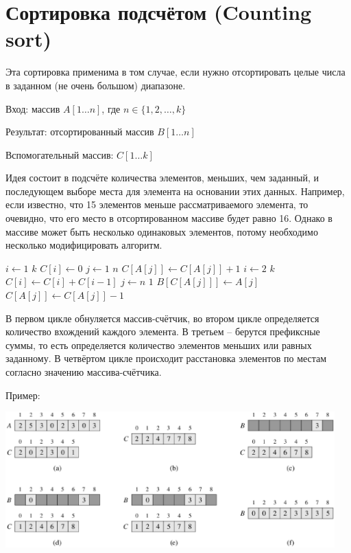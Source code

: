 \documentclass[a4paper,11pt]{article}
\begin{document}
\section{Сортировка подсчётом (Counting sort)}
Эта сортировка применима в том случае, если нужно отсортировать целые числа в
заданном (не очень большом) диапазоне.

Вход: массив $A[1 \ldots n]$, где $n \in \lbrace 1, 2, \ldots, k \rbrace$

Результат: отсортированный массив $B[1 \ldots n]$

Вспомогательный массив: $C[1 \ldots k]$

Идея состоит в подсчёте количества элементов, меньших, чем заданный, и
последующем выборе места для элемента на основании этих данных. Например, если
известно, что 15 элементов меньше рассматриваемого элемента, то очевидно, что
его место в отсортированном массиве будет равно 16. Однако в массиве может быть
несколько одинаковых элементов, потому необходимо несколько модифицировать
алгоритм.

\begin{codebox}
\li \For $i \gets 1 $ \To $k$
\li      \Do $C[i] \gets 0$ \End
\li \For $j \gets 1 $ \To $n$
\li      \Do $C[A[j]] \gets C[A[j]] + 1$ \End
\li \For $i \gets 2 $ \To $k$
\li      \Do $C[i] \gets C[i] + C[i-1]$ \End
\li \For $j \gets n $ \Downto $1$
\li      \Do $B[C[A[j]]] \gets A[j]$
\li          $C[A[j]] \gets C[A[j]] - 1$
         \End
\end{codebox}

В первом цикле обнуляется массив-счётчик, во втором цикле определяется
количество вхождений каждого элемента. В третьем -- берутся префиксные суммы, то
есть определяется количество элементов меньших или равных заданному. В четвёртом
цикле происходит расстановка элементов по местам согласно значению массива-счётчика.

Пример:

\includegraphics[width=5in]{lecture5/counting-sort.eps}
\end{document}
